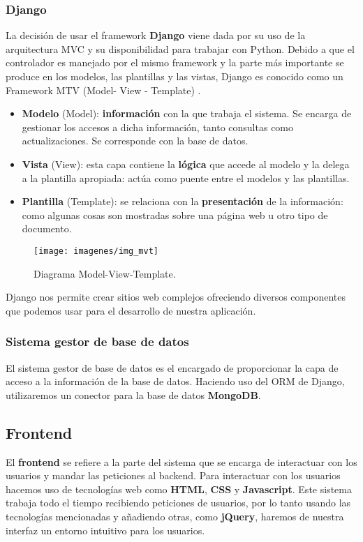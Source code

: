 \hfill\begin{minipage}{\dimexpr\textwidth-1cm}
	\subsubsection{Django}
	La decisión de usar el framework \textbf{Django} viene dada por su uso de la arquitectura MVC y su disponibilidad para trabajar con Python. Debido a que el controlador es manejado por el mismo framework y la parte más importante se produce en los modelos, las plantillas y las vistas, Django es conocido como un Framework MTV (Model- View - Template) \cite{cita_mvt}.
	\begin{itemize}
		\item \textbf{Modelo} (Model): \textbf{información} con la que trabaja el sistema. Se encarga de gestionar los accesos a dicha información, tanto consultas como actualizaciones. Se corresponde con la base de datos.
		\item \textbf{Vista} (View): esta capa contiene la \textbf{lógica} que accede al modelo y la delega a la plantilla apropiada: actúa como puente entre el modelos y las plantillas.
		\item \textbf{Plantilla} (Template): se relaciona con la \textbf{presentación} de la información: como algunas cosas son mostradas sobre una página web u otro tipo de documento. \\
	\end{itemize}
	
	\begin{figure}[H]
		\centering
		\texttt{[image: imagenes/img\_mvt]}
		\caption{Diagrama Model-View-Template.}
		\label{fig:img_mvt}
	\end{figure}
	
	Django nos permite crear sitios web complejos ofreciendo diversos componentes que podemos usar para el desarrollo de nuestra aplicación.
	
	\subsubsection{Sistema gestor de base de datos}
	El sistema gestor de base de datos es el encargado de proporcionar la capa de acceso a la información de la base de datos. Haciendo uso del ORM de Django, utilizaremos un conector para la base de datos \textbf{MongoDB}.
\end{minipage}

\subsection{Frontend}
El \textbf{frontend} se refiere a la parte del sistema que se encarga de interactuar con los usuarios y mandar las peticiones al backend. Para interactuar con los usuarios hacemos uso de tecnologías web como \textbf{HTML}, \textbf{CSS} y \textbf{Javascript}. Este sistema trabaja todo el tiempo recibiendo peticiones de usuarios, por lo tanto usando las tecnologías mencionadas y añadiendo otras, como \textbf{jQuery}, haremos de nuestra interfaz un entorno intuitivo para los usuarios. \\

